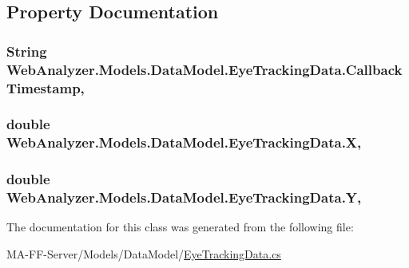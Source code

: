 \subsection{Property Documentation}
\hypertarget{class_web_analyzer_1_1_models_1_1_data_model_1_1_eye_tracking_data_a2e2cc407404ad7cd9fbd75be533d5967}{}
\subsubsection[{Callback\+Timestamp}]{\setlength{\rightskip}{0pt plus 5cm}String Web\+Analyzer.\+Models.\+Data\+Model.\+Eye\+Tracking\+Data.\+Callback\+Timestamp\hspace{0.3cm}{\ttfamily [get]}, {\ttfamily [set]}}\label{class_web_analyzer_1_1_models_1_1_data_model_1_1_eye_tracking_data_a2e2cc407404ad7cd9fbd75be533d5967}
\hypertarget{class_web_analyzer_1_1_models_1_1_data_model_1_1_eye_tracking_data_afc6ab652582e4aaccb30d64fb58a2a0c}{}
\subsubsection[{X}]{\setlength{\rightskip}{0pt plus 5cm}double Web\+Analyzer.\+Models.\+Data\+Model.\+Eye\+Tracking\+Data.\+X\hspace{0.3cm}{\ttfamily [get]}, {\ttfamily [set]}}\label{class_web_analyzer_1_1_models_1_1_data_model_1_1_eye_tracking_data_afc6ab652582e4aaccb30d64fb58a2a0c}
\hypertarget{class_web_analyzer_1_1_models_1_1_data_model_1_1_eye_tracking_data_a2b76ad3ab08710a4ef0ecf42c6b6a8f3}{}
\subsubsection[{Y}]{\setlength{\rightskip}{0pt plus 5cm}double Web\+Analyzer.\+Models.\+Data\+Model.\+Eye\+Tracking\+Data.\+Y\hspace{0.3cm}{\ttfamily [get]}, {\ttfamily [set]}}\label{class_web_analyzer_1_1_models_1_1_data_model_1_1_eye_tracking_data_a2b76ad3ab08710a4ef0ecf42c6b6a8f3}


The documentation for this class was generated from the following file\+:\begin{DoxyCompactItemize}
\item 
M\+A-\/\+F\+F-\/\+Server/\+Models/\+Data\+Model/\hyperlink{_eye_tracking_data_8cs}{Eye\+Tracking\+Data.\+cs}\end{DoxyCompactItemize}
